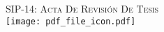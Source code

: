 
\newpage
\thispagestyle{empty}
\begin{center}
	\vspace*{\fill}
	

	\Large\textsc{SIP-14: Acta De Revisión De Tesis}\\[0.2cm]
  \texttt{[image: pdf\_file\_icon.pdf]}

	\vspace*{\fill}

\end{center}
\cleardoublepage
